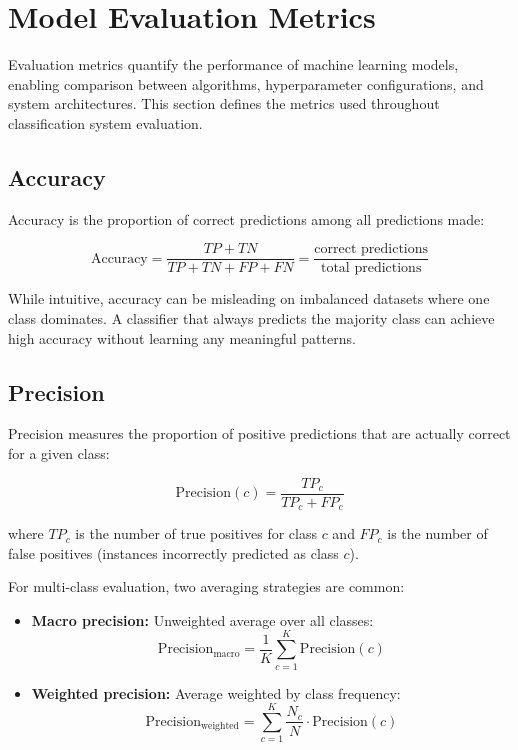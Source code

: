 \documentclass[10pt,a4paper]{article}
\begin{document}
\section{Model Evaluation Metrics}
\label{sec:evaluation-metrics}

Evaluation metrics quantify the performance of machine learning models, enabling comparison between algorithms, hyperparameter configurations, and system architectures. This section defines the metrics used throughout classification system evaluation.

\subsection{Accuracy}
\label{sec:accuracy}

Accuracy is the proportion of correct predictions among all predictions made:

\begin{equation}
\text{Accuracy} = \frac{TP + TN}{TP + TN + FP + FN} = \frac{\text{correct predictions}}{\text{total predictions}}
\label{eq:accuracy}
\end{equation}

While intuitive, accuracy can be misleading on imbalanced datasets where one class dominates. A classifier that always predicts the majority class can achieve high accuracy without learning any meaningful patterns.

\subsection{Precision}
\label{sec:precision}

Precision measures the proportion of positive predictions that are actually correct for a given class:

\begin{equation}
\text{Precision}(c) = \frac{TP_c}{TP_c + FP_c}
\label{eq:precision}
\end{equation}

where $TP_c$ is the number of true positives for class $c$ and $FP_c$ is the number of false positives (instances incorrectly predicted as class $c$).

For multi-class evaluation, two averaging strategies are common:

\begin{itemize}
    \item \textbf{Macro precision:} Unweighted average over all classes:
    \begin{equation}
    \text{Precision}_{\text{macro}} = \frac{1}{K} \sum_{c=1}^{K} \text{Precision}(c)
    \label{eq:precision-macro}
    \end{equation}
    \item \textbf{Weighted precision:} Average weighted by class frequency:
    \begin{equation}
    \text{Precision}_{\text{weighted}} = \sum_{c=1}^{K} \frac{N_c}{N} \cdot \text{Precision}(c)
    \label{eq:precision-weighted}
    \end{equation}
\end{itemize}
\end{document}
